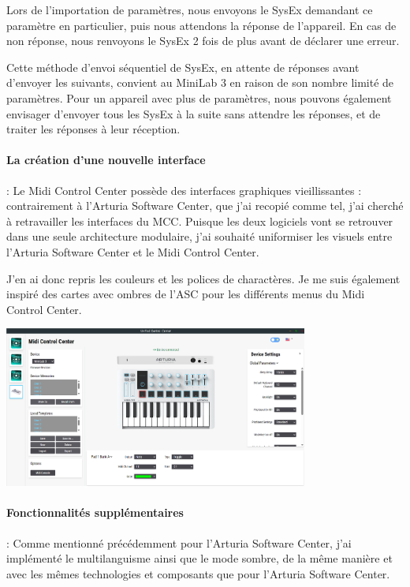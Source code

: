 \documentclass[francais]{rapportPFE}  %
\begin{document}
Lors de l'importation de paramètres, nous envoyons le SysEx demandant ce paramètre en particulier, puis nous attendons la réponse de l'appareil. En cas de non réponse, nous renvoyons le SysEx 2 fois de plus avant de déclarer une erreur.

Cette méthode d'envoi séquentiel de SysEx, en attente de réponses avant d'envoyer les suivants, convient au MiniLab 3 en raison de son nombre limité de paramètres. Pour un appareil avec plus de paramètres, nous pouvons également envisager d'envoyer tous les SysEx à la suite sans attendre les réponses, et de traiter les réponses à leur réception.

\paragraph{La création d'une nouvelle interface}:
Le Midi Control Center possède des interfaces graphiques vieillissantes : contrairement à l'Arturia Software Center, que j'ai recopié comme tel, j'ai cherché à retravailler les interfaces du MCC. Puisque les deux logiciels vont se retrouver dans une seule architecture modulaire, j'ai souhaité uniformiser les visuels entre l'Arturia Software Center et le Midi Control Center.

J'en ai donc repris les couleurs et les polices de charactères. Je me suis également inspiré des cartes avec ombres de l'ASC pour les différents menus du Midi Control Center.


\begin{center}
    \centering
    \includegraphics[width=10cm]{graphics/mcc_new.png}
    \label{fig:test1}
\end{center}


\paragraph{Fonctionnalités supplémentaires}:
Comme mentionné précédemment pour l'Arturia Software Center, j'ai implémenté le multilanguisme ainsi que le mode sombre, de la même manière et avec les mêmes technologies et composants que pour l'Arturia Software Center.
\end{document}
